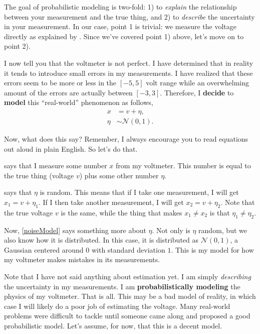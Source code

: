 \documentclass[10pt,letterpaper]{article}
\begin{document}
The goal of probabilistic modeling is two-fold: 1) to \emph{explain} the relationship between your measurement and the true thing, and 2) to \emph{describe} the uncertainty in your measurement. In our case, point 1 is trivial: we measure the voltage directly as explained by . Since we've covered point 1) above, let's move on to point 2).

I now tell you that the voltmeter is not perfect. I have determined that in reality it tends to introduce small errors in my measurements. I have realized that these errors seem to be more or less in the $[-5, 5]$ volt range while an overwhelming amount of the errors are actually between $[-3, 3]$. Therefore, I \textbf{decide} to \textbf{model} this ``real-world'' phenomenon as follows,
\begin{align}
	x &= v + \eta, \label{measurementModel}\\
	\eta &\sim \mathcal{N}(0,1)\label{noiseModel}.
\end{align}

Now, what does this say? Remember, I always encourage you to read equations out aloud in plain English. So let's do that. 

 says that I measure some number $x$ from my voltmeter. This number is equal to the true thing (voltage $v$) plus some other number $\eta$. 

 says that $\eta$ is random. This means that if I take one measurement, I will get $x_1 = v + \eta_1$. If I then take another measurement, I will get $x_2 = v + \eta_2$. Note that the true voltage $v$ is the same, while the thing that makes $x_1 \neq x_2$ is that $\eta_1 \neq \eta_2$. 

Now, \cref{noiseModel} says something more about $\eta$. Not only is $\eta$ random, but we also know how it is distributed. In this case, it is distributed as $\mathcal{N}(0,1)$, a Gaussian centered around $0$ with standard deviation $1$. This is my model for how my voltmeter makes mistakes in its measurements. 

Note that I have not said anything about estimation yet. I am simply \emph{describing} the uncertainty in my measurements. I am \textbf{probabilistically modeling} the physics of my voltmeter. That is all. This may be a bad model of reality, in which case I will likely do a poor job of estimating the voltage. Many real-world problems were difficult to tackle until someone came along and proposed a good probabilistic model. Let's assume, for now, that this is a decent model.
\end{document}
